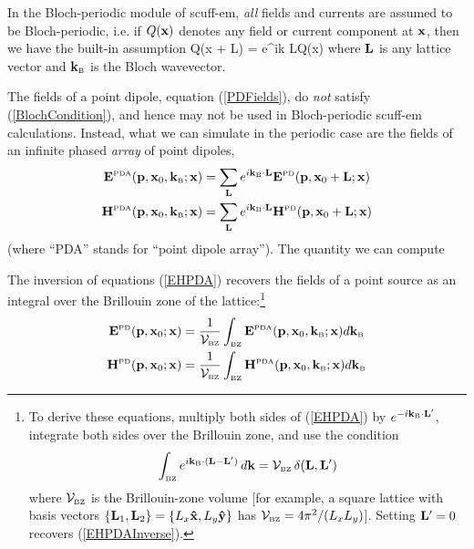 \documentclass[letterpaper]{article}
\begin{document}
In the Bloch-periodic module of {\sc scuff-em}, \textit{all}
fields and currents are assumed to be Bloch-periodic, i.e.
if $Q(\mathbf{x})$ denotes any field or current component at $\mathbf{x}$,
then we have the built-in assumption
{Q(\vb x + \vb L) = e^{i\vb k \cdot \vb L}Q(\vb x)}
where $\mathbf{L}$ is any lattice vector and 
$\mathbf{k}_{\hbox{\tiny{B}}}$ is the Bloch wavevector.

The fields of a point dipole, equation (\ref{PDFields}), do \textit{not}
satisfy (\ref{BlochCondition}), and hence may not be used in
Bloch-periodic {\sc scuff-em} calculations. Instead, what we can 
simulate in the periodic case are the fields of an infinite
phased \textit{array} of point dipoles,
\begin{subequations}
\begin{align*}
 \mathbf{E}^{\hbox{\tiny{PDA}}}(\mathbf{p}, \mathbf{x}_0, \mathbf{k}_{\hbox{\tiny{B}}}; \mathbf{x})
&=\sum_{\mathbf{L}} e^{i\mathbf{k}_{\hbox{\tiny{B}}}\cdot \mathbf{L}}
  \mathbf{E}^{\hbox{\tiny{PD}}}(\mathbf{p}, \mathbf{x}_0 + \mathbf{L}; \mathbf{x})
\\
 \mathbf{H}^{\hbox{\tiny{PDA}}}(\mathbf{p}, \mathbf{x}_0, \mathbf{k}_{\hbox{\tiny{B}}}; \mathbf{x})
&=\sum_{\mathbf{L}} e^{i\mathbf{k}_{\hbox{\tiny{B}}} \cdot \mathbf{L}}
  \mathbf{H}^{\hbox{\tiny{PD}}}(\mathbf{p}, \mathbf{x}_0  + \mathbf{L}; \mathbf{x})
\end{align*}
\label{EHPDA}
\end{subequations}
(where ``PDA'' stands for ``point dipole array''). The quantity
we can compute

The inversion of equations (\ref{EHPDA}) recovers the fields
of a point source as an integral over the Brillouin zone of the 
lattice:\footnote{To derive these equations, multiply both sides
of (\ref{EHPDA}) by $e^{-i\mathbf{k}_{\hbox{\tiny{B}}} \cdot \mathbf{L}^\prime}$,
integrate both sides over the Brillouin zone, and use the
condition 
$$\int_{\hbox{\tiny{BZ}}} e^{i\mathbf{k}_{\hbox{\tiny{B}}}\cdot (\mathbf{L}-\mathbf{L}^\prime)}\,d\mathbf{k}
  =\mathcal{V}_{\hbox{\tiny{BZ}}} \, \delta(\mathbf{L},\mathbf{L}^\prime)
$$
where $\mathcal{V}_{\hbox{\tiny{BZ}}}$ is the Brillouin-zone volume [for example,
a square lattice with basis vectors
$\{\mathbf{L}_1, \mathbf{L}_2\}=\{L_x\mathbf{\hat x}, L_y\mathbf{\hat y}\}$ has
$\mathcal{V}_{\hbox{\tiny{BZ}}}=4\pi^2/(L_x L_y)$].
Setting $\mathbf{L}^\prime=0$ recovers (\ref{EHPDAInverse}).}
\begin{subequations}
\begin{align}
  \mathbf{E}^{\hbox{\tiny{PD}}}(\mathbf{p}, \mathbf{x}_0; \mathbf{x})
&=\frac{1}{\mathcal{V}_{\hbox{\tiny{BZ}}}} 
   \int_{\hbox{\tiny{BZ}}} \mathbf{E}^{\hbox{\tiny{PDA}}}(\mathbf{p}, \mathbf{x}_0, \mathbf{k}_{\hbox{\tiny{B}}}; \mathbf{x}) 
   d\mathbf{k}_{\hbox{\tiny{B}}}
\\
  \mathbf{H}^{\hbox{\tiny{PD}}}(\mathbf{p}, \mathbf{x}_0; \mathbf{x})
&=\frac{1}{\mathcal{V}_{\hbox{\tiny{BZ}}}} 
   \int_{\hbox{\tiny{BZ}}} \mathbf{H}^{\hbox{\tiny{PDA}}}(\mathbf{p}, \mathbf{x}_0, \mathbf{k}_{\hbox{\tiny{B}}}; \mathbf{x}) 
   d\mathbf{k}_{\hbox{\tiny{B}}}
\end{align}
\label{EHPDAInverse}
\end{subequations}
\end{document}
